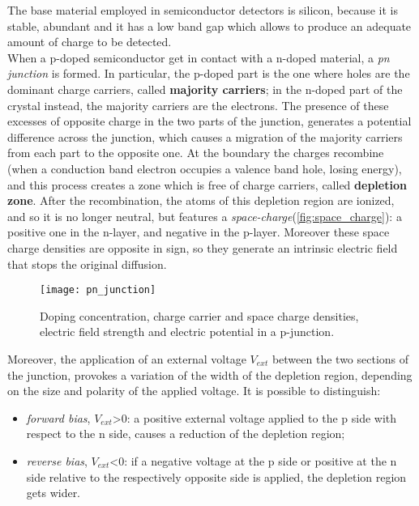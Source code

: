 The base material employed in semiconductor detectors is silicon, because it is stable, abundant and it has a low band gap which allows to produce an adequate amount of charge to be detected.\\ 
When a p-doped semiconductor get in contact with a n-doped material, a \textit{pn junction} is formed. In particular, the p-doped part is the one where holes are the dominant charge carriers, called \textbf{majority carriers}; in the n-doped part of the crystal instead, the majority carriers are the electrons. 
The presence of these excesses of opposite charge in the two parts of the junction, generates a potential difference across the junction, which causes a migration of the majority carriers from each part to the opposite one. At the boundary the charges recombine (when a conduction band electron occupies a valence band hole, losing energy), and this process creates a zone which is free of charge carriers, called \textbf{depletion zone}. After the recombination, the atoms of this depletion region are ionized, and so it is no longer neutral, but features a \emph{space-charge}(\autoref{fig:space_charge}): a positive one in the n-layer, and negative in the p-layer. Moreover these space charge densities are opposite in sign, so they generate an intrinsic electric field that stops the original diffusion.\\

\begin{figure}
\centering
\texttt{[image: pn\_junction]}
\caption{Doping concentration, charge carrier and space charge densities, electric field strength and electric potential in a p-junction.}
\label{fig:space_charge}
\end{figure}

Moreover, the application of an external voltage $V_{ext}$ between the two sections of the junction, provokes a variation of the width of the depletion region, depending on the size and polarity of the applied voltage. It is possible to distinguish:%

\begin{itemize}
\item \emph{forward bias}, $V_{ext}$>0: a positive external voltage applied to the p side with respect to the n side, causes a reduction of the depletion region;
\item \emph{reverse bias}, $V_{ext}$<0: if a negative voltage at the p side or positive at the n side relative to the respectively opposite side is applied, the depletion region gets wider.
\end{itemize}

